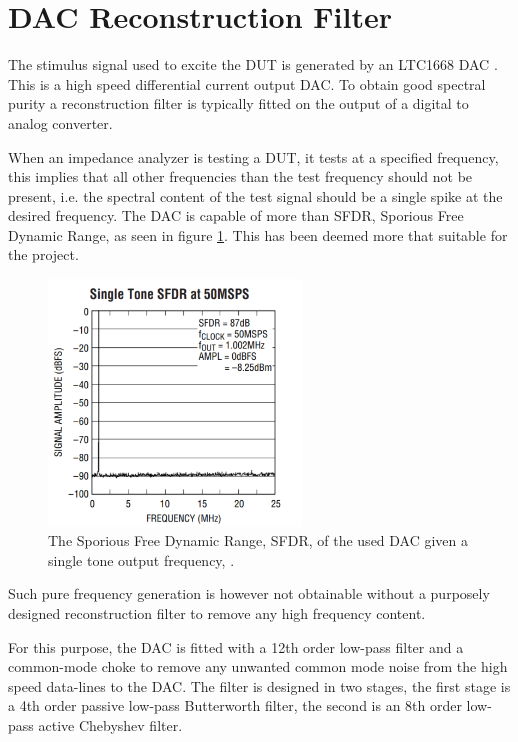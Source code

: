 \section{DAC Reconstruction Filter} \label{subsec:DAC_Power}
The stimulus signal used to excite the DUT is generated by an LTC1668 DAC \cite{DAC_LTC1668}. This is a high speed differential current output DAC. To obtain good spectral purity a reconstruction filter is typically fitted on the output of a digital to analog converter.

When an impedance analyzer is testing a DUT, it tests at a specified frequency, this implies that all other frequencies than the test frequency should not be present, i.e. the spectral content of the test signal should be a single spike at the desired frequency. The DAC is capable of more than  SFDR, Sporious Free Dynamic Range, as seen in figure \ref{fig_7_1_1_SFDR}. This has been deemed more that suitable for the project. 

\begin{figure}[H]
    \centering
    \includegraphics[clip, trim=0 0 0 0, width=0.6\textwidth]{Sections/7_SystemDesign/Figures/7_1_1_DAC_SingleTone_SFDR.pdf}
    \caption{The Sporious Free Dynamic Range, SFDR, of the used DAC given a single tone output frequency, \cite{DAC_LTC1668}.}
    \label{fig_7_1_1_SFDR}
\end{figure}

Such pure frequency generation is however not obtainable without a purposely designed reconstruction filter to remove any high frequency content.

For this purpose, the DAC is fitted with a 12th order low-pass filter and a common-mode choke to remove any unwanted common mode noise from the high speed data-lines to the DAC. The filter is designed in two stages, the first stage is a 4th order passive low-pass Butterworth filter, the second is an 8th order low-pass active Chebyshev filter.

